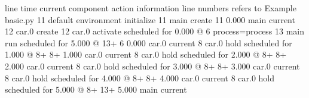 \documentclass[letterpaper,10pt,english]{sphinxmanual}
\begin{document}
\begin{sphinxVerbatim}[commandchars=\\\{\}]
line\PYGZsh{}         time current component    action                               information
\PYGZhy{}\PYGZhy{}\PYGZhy{}\PYGZhy{}\PYGZhy{}   \PYGZhy{}\PYGZhy{}\PYGZhy{}\PYGZhy{}\PYGZhy{}\PYGZhy{}\PYGZhy{}\PYGZhy{}\PYGZhy{}\PYGZhy{} \PYGZhy{}\PYGZhy{}\PYGZhy{}\PYGZhy{}\PYGZhy{}\PYGZhy{}\PYGZhy{}\PYGZhy{}\PYGZhy{}\PYGZhy{}\PYGZhy{}\PYGZhy{}\PYGZhy{}\PYGZhy{}\PYGZhy{}\PYGZhy{}\PYGZhy{}\PYGZhy{}\PYGZhy{}\PYGZhy{} \PYGZhy{}\PYGZhy{}\PYGZhy{}\PYGZhy{}\PYGZhy{}\PYGZhy{}\PYGZhy{}\PYGZhy{}\PYGZhy{}\PYGZhy{}\PYGZhy{}\PYGZhy{}\PYGZhy{}\PYGZhy{}\PYGZhy{}\PYGZhy{}\PYGZhy{}\PYGZhy{}\PYGZhy{}\PYGZhy{}\PYGZhy{}\PYGZhy{}\PYGZhy{}\PYGZhy{}\PYGZhy{}\PYGZhy{}\PYGZhy{}\PYGZhy{}\PYGZhy{}\PYGZhy{}\PYGZhy{}\PYGZhy{}\PYGZhy{}\PYGZhy{}\PYGZhy{}  \PYGZhy{}\PYGZhy{}\PYGZhy{}\PYGZhy{}\PYGZhy{}\PYGZhy{}\PYGZhy{}\PYGZhy{}\PYGZhy{}\PYGZhy{}\PYGZhy{}\PYGZhy{}\PYGZhy{}\PYGZhy{}\PYGZhy{}\PYGZhy{}\PYGZhy{}\PYGZhy{}\PYGZhy{}\PYGZhy{}\PYGZhy{}\PYGZhy{}\PYGZhy{}\PYGZhy{}\PYGZhy{}\PYGZhy{}\PYGZhy{}\PYGZhy{}\PYGZhy{}\PYGZhy{}\PYGZhy{}\PYGZhy{}\PYGZhy{}\PYGZhy{}\PYGZhy{}\PYGZhy{}\PYGZhy{}\PYGZhy{}\PYGZhy{}\PYGZhy{}\PYGZhy{}\PYGZhy{}\PYGZhy{}\PYGZhy{}\PYGZhy{}\PYGZhy{}\PYGZhy{}\PYGZhy{}
                                        line numbers refers to               Example \PYGZhy{} basic.py
   11                                   default environment initialize
   11                                   main create
   11        0.000 main                 current
   12                                   car.0 create
   12                                   car.0 activate                       scheduled for      0.000 @    6  process=process
   13                                   main run                             scheduled for      5.000 @   13+
    6        0.000 car.0                current
    8                                   car.0 hold                           scheduled for      1.000 @    8+
    8+       1.000 car.0                current
    8                                   car.0 hold                           scheduled for      2.000 @    8+
    8+       2.000 car.0                current
    8                                   car.0 hold                           scheduled for      3.000 @    8+
    8+       3.000 car.0                current
    8                                   car.0 hold                           scheduled for      4.000 @    8+
    8+       4.000 car.0                current
    8                                   car.0 hold                           scheduled for      5.000 @    8+
   13+       5.000 main                 current
\end{sphinxVerbatim}
\end{document}
